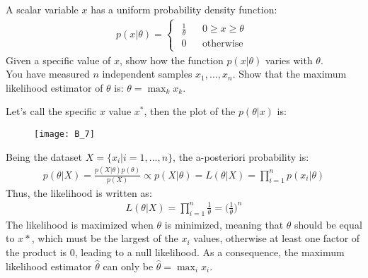 \Exercise[number={7}]
A scalar variable \(x\) has a uniform probability density function:
\begin{align*}
    p(x|\theta)=
    \begin{cases}
        \begin{matrix}
            \frac{1}{\theta} && 0\ge x\ge \theta \\ 0 && \text{otherwise}
        \end{matrix}
    \end{cases}
\end{align*}
Given a specific value of \(x\), show how the function \(p(x|\theta)\)
varies with \(\theta\).\\
You have measured \(n\) independent samples \(x_1,...,x_n\).
Show that the maximum likelihood estimator of \(\theta\) is: \(\theta=\max_{k}x_k\).

\Answer[number={7}]
Let's call the specific \(x\) value \(x^*\), then the plot of the
\(p(\theta|x)\) is:
\begin{figure}[H]
    \texttt{[image: B\_7]}
    \centering
\end{figure}
Being the dataset \(X=\{x_i|i=1,...,n\}\), the a-posteriori probability is:
\begin{align*}
    p(\theta|X)=\frac{p(X|\theta)p(\theta)}{p(X)}
    \propto
    p(X|\theta)=L(\theta|X)=\prod_{i=1}^{n}p(x_i|\theta)
\end{align*}
Thus, the likelihood is written as:
\begin{align*}
    L(\theta|X)=\prod_{i=1}^{n}\frac{1}{\theta}=\biggl(\frac{1}{\theta}\biggr)^{n}
\end{align*}
The likelihood is maximized when \(\theta\) is minimized, meaning that \(\theta\)
should be equal to \(x*\), which must be the largest of the \(x_i\) values,
otherwise at least one factor of the product is 0, leading to a null likelihood.
As a consequence, the maximum likelihood estimator \(\hat{\theta}\) can
only be \(\hat{\theta}=\max_{i}x_i\).